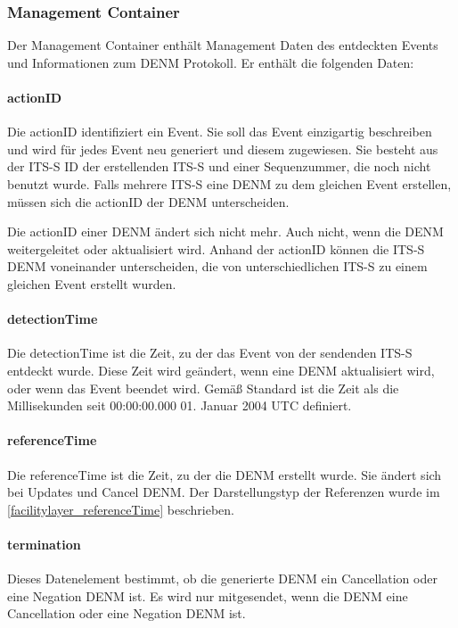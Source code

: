 \subsubsection{Management Container}
Der Management Container enthält Management Daten des entdeckten Events und Informationen zum \ac{DENM} Protokoll. Er enthält die folgenden Daten:
\paragraph{actionID}
Die actionID identifiziert ein Event. Sie soll das Event einzigartig beschreiben und wird für jedes Event neu generiert und diesem zugewiesen. Sie besteht aus der \ac{ITS-S} \ac{ID} der erstellenden \ac{ITS-S} und einer Sequenzummer, die noch nicht benutzt wurde. Falls mehrere \ac{ITS-S} eine \ac{DENM} zu dem gleichen Event erstellen, müssen sich die actionID der \ac{DENM} unterscheiden. 

Die actionID einer \ac{DENM} ändert sich nicht mehr. Auch nicht, wenn die \ac{DENM} weitergeleitet oder aktualisiert wird. Anhand der actionID können die \ac{ITS-S} \ac{DENM} voneinander unterscheiden, die von unterschiedlichen \ac{ITS-S} zu einem gleichen Event erstellt wurden.

\paragraph{detectionTime \label{facilitylayer_referenceTime}}
Die detectionTime ist die Zeit, zu der das Event von der sendenden \ac{ITS-S} entdeckt wurde. Diese Zeit wird geändert, wenn eine \ac{DENM} aktualisiert wird, oder wenn das Event beendet wird. Gemäß Standard \cite{ts102894-2} ist die Zeit als die Millisekunden seit 00:00:00.000 01. Januar 2004 \ac{UTC} definiert.

\paragraph{referenceTime}
Die referenceTime ist die Zeit, zu der die \ac{DENM} erstellt wurde. Sie ändert sich bei Updates und Cancel \ac{DENM}. Der Darstellungstyp der Referenzen wurde im \autoref{facilitylayer_referenceTime} beschrieben.

\paragraph{termination}
Dieses Datenelement bestimmt, ob die generierte \ac{DENM} ein Cancellation oder eine Negation \ac{DENM} ist. Es wird nur mitgesendet, wenn die \ac{DENM} eine Cancellation oder eine Negation \ac{DENM} ist. 


